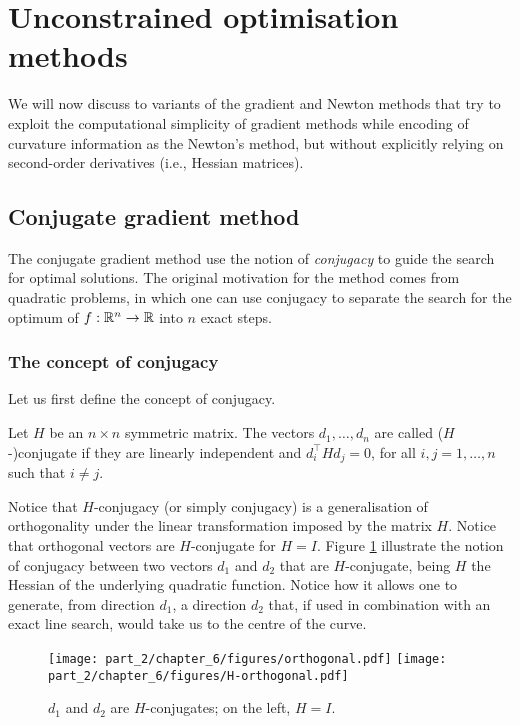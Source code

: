 
\section{Unconstrained optimisation methods}

We will now discuss to variants of the gradient and Newton methods that try to exploit the computational simplicity of gradient methods while encoding of curvature information as the Newton's method, but without explicitly relying on second-order derivatives (i.e., Hessian matrices).

\subsection{Conjugate gradient method}

The conjugate gradient method use the notion of \emph{conjugacy} to guide the search for optimal solutions. The original motivation for the method comes from quadratic problems, in which one can use conjugacy to separate the search for the optimum of $f:\mathbb{R}^n \to \mathbb{R}$ into $n$ exact steps. 

\subsubsection{The concept of conjugacy}

Let us first define the concept of conjugacy.
%
\begin{definition}
Let $H$ be an $n \times n$ symmetric matrix. The vectors $d_1, \dots, d_n$ are called ($H$-)conjugate if they are linearly independent and $d_i^\top Hd_j = 0$, for all $i,j = 1,\dots,n$ such that $i \neq j$. 
\end{definition}

Notice that $H$-conjugacy (or simply conjugacy) is a generalisation of orthogonality under the linear transformation imposed by the matrix $H$. Notice that orthogonal vectors are $H$-conjugate for $H = I$. Figure \ref{fig:conjugates} illustrate the notion of conjugacy between two vectors $d_1$ and $d_2$ that are $H$-conjugate, being $H$ the Hessian of the underlying quadratic function. Notice how it allows one to generate, from direction $d_1$, a direction $d_2$ that, if used in combination with an exact line search, would take us to the centre of the curve.

\begin{figure}[H]
	\texttt{[image: part\_2/chapter\_6/figures/orthogonal.pdf]}
	\texttt{[image: part\_2/chapter\_6/figures/H-orthogonal.pdf]}
	\caption{$d_1$ and $d_2$ are $H$-conjugates; on the left, $H = I$.} \label{fig:conjugates}
\end{figure}


